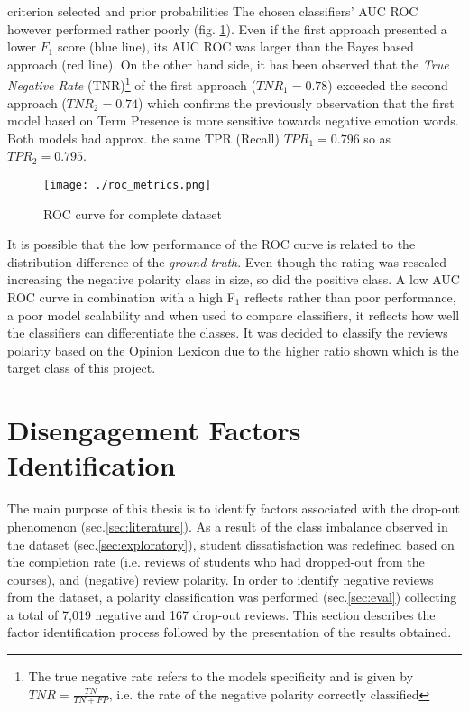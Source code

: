 \documentclass[
	a4paper,
	pdftex,
	12pt,	
	footinclude=true,
	fleqn,
	final,
	]{report}%
\begin{document}
criterion selected and prior probabilities \cite{Chawla2005} 
The chosen classifiers' AUC ROC however performed rather poorly (fig. \ref{fig:25}). 
Even if the first approach presented a lower $F_{1}$ score (blue line), 
its AUC ROC was larger than the Bayes based approach (red line).
On the other hand side, it has been observed that 
the \emph{True Negative Rate} (TNR)\footnote{The true negative rate refers to the models 
specificity and is given by $TNR = \frac{TN}{TN + FP}$, i.e. the rate of the 
negative polarity correctly classified} of the first approach ($TNR_{1} = 0.78$) 
exceeded the second approach ($TNR_{2} = 0.74$) which confirms the previously observation 
that the first model based on Term Presence is more sensitive towards negative emotion 
words. Both models had approx. the same TPR (Recall) $TPR_{1} = 0.796$ so 
as $TPR_{2} = 0.795$.

\begin{figure}[h]
 \centering
 \texttt{[image: ./roc\_metrics.png]}
 \caption{ROC curve for complete dataset}
 \label{fig:25}
\end{figure}
It is possible that the low performance of the ROC curve is related 
to the distribution difference of the \emph{ground truth}. 
Even though the rating was rescaled increasing the negative polarity 
class in size, so did the positive class.
A low AUC ROC curve in combination with a high F$_{1}$ reflects 
rather than poor performance, a poor model scalability \cite{Taylor2012} 
and when used to compare classifiers, it reflects how well
the classifiers can differentiate the classes. 
It was decided to classify the reviews polarity based on 
the Opinion Lexicon due to the higher  
ratio shown which is the target class of this project.
\section{Disengagement Factors Identification}
\label{sec:disengaged}
\vspace{-0.3cm}
The main purpose of this thesis is to identify factors 
associated with the drop-out phenomenon (sec.\ref{sec:literature}). 
As a result of the class imbalance observed in the
dataset (sec.\ref{sec:exploratory}), 
student dissatisfaction was redefined 
based on the completion rate (i.e. reviews of students who had 
dropped-out from the courses), and (negative) review polarity. 
In order to identify negative reviews from the dataset, 
a polarity classification was performed (sec.\ref{sec:eval})
collecting a total of 7,019 negative and 167 drop-out reviews. 
This section describes the factor identification process
followed by the presentation of the results obtained.
\end{document}

